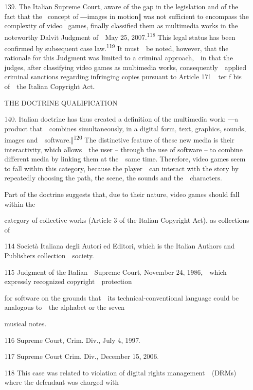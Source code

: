\documentclass[
]{article}
\begin{document}
{139. }{The Italian Supreme Court, aware of the gap in the legislation
and of the fact that the }{~concept of ―images in motion‖ was not
sufficient to encompass the complexity of video }{~games, finally
classified them as multimedia works in the noteworthy Dalvit Judgment
of~~May 25, 2007.}\textsuperscript{{118 }}{This legal status has been
confirmed by subsequent case law.}\textsuperscript{{119 }}{It must~~be
noted, however, that the rationale for this Judgment was limited to a
criminal approach,~~in that the judges, after classifying video games as
multimedia works, consequently~~applied criminal sanctions regarding
infringing copies pursuant to Article 171~~}{ter }{f }{bis }{of~~the
Italian }{Copyright Act}{.}

{THE DOCTRINE QUALIFICATION}

{140. }{Italian doctrin}{e has thus created a definition of the
multimedia work: ―}{a product that~~combines simultaneously, in a
digital form, text, graphics, sounds, images
and~~software.}{‖}\textsuperscript{{120 }}{The distinctive feature of
these new media is their interactivity, which allows~~the user }{--
}{through the use of software }{-- }{to combine different media by
linking them at the~~same time. Therefore, video games seem to fall
within this category, because the player~~can interact with the story by
repeatedly choosing the path, the scene, the sounds and
the~~characters.}

{Part of the doctrine suggests that, due to their nature, video games
should fall within the}

{category of collective works (Article 3 of the Italian }{Copyright
Act}{), as collections of}

{114 }{Società Italiana degli Autori ed Editori, which is the Italian
Authors and Publishers collection~~society.}

{115 }{Judgment of the Italian~~Supreme Court, November 24, 1986,~~which
expressly recognized copyright~~protection}

{for software on the grounds that~~its technical-conventional language
could be analogous to~~the alphabet or the seven}

{musical notes.}

{116 }{Supreme Court, Crim. Div., July 4, 1997.}

{117 }{Supreme Court Crim. Div., December 15, 2006.}

{118 }{This case was related to violation of digital rights
management~~(DRMs) where the defendant was charged with}
\end{document}
